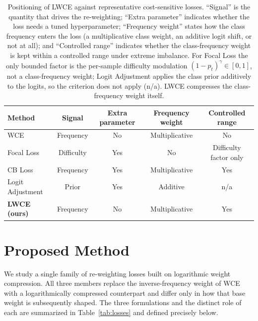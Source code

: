 \documentclass[a4paper,fleqn]{cas-sc}
\begin{document}
\begin{table}[pos=h]
\centering
\caption{Positioning of LWCE against representative cost-sensitive losses.
``Signal'' is the quantity that drives the re-weighting; ``Extra parameter''
indicates whether the loss needs a tuned hyperparameter; ``Frequency weight''
states how the class frequency enters the loss (a multiplicative class weight, an
additive logit shift, or not at all); and ``Controlled range'' indicates whether
the class-frequency weight is kept within a controlled range under extreme
imbalance. For Focal Loss the only bounded factor is the per-sample difficulty
modulation $(1-p_t)^{\gamma}\!\in[0,1]$, not a class-frequency weight; Logit
Adjustment applies the class prior additively to the logits, so the criterion does
not apply (n/a). LWCE compresses the class-frequency weight itself.}
\label{tab:positioning}
\begin{tabular}{lcccc}
\toprule
Method & Signal & Extra parameter & Frequency weight & Controlled range \\
\midrule
WCE                  & Frequency  & No  & Multiplicative & No \\
Focal Loss           & Difficulty & Yes & No             & Difficulty factor only \\
CB Loss              & Frequency  & Yes & Multiplicative & Yes \\
Logit Adjustment     & Prior      & Yes & Additive       & n/a \\
\textbf{LWCE (ours)} & Frequency  & No  & Multiplicative & Yes \\
\bottomrule
\end{tabular}
\end{table}

\section{Proposed Method}\label{sec:method}

We study a single family of re-weighting losses built on logarithmic weight
compression. All three members replace the inverse-frequency weight of WCE with
a logarithmically compressed counterpart and differ only in how that base weight
is subsequently shaped. The three formulations and the distinct role of each are
summarized in Table~\ref{tab:losses} and defined precisely below.
\end{document}
